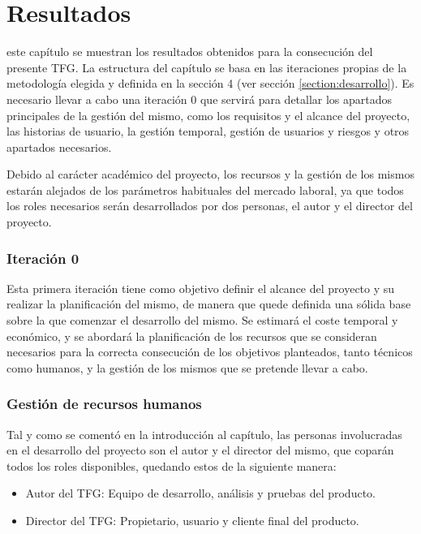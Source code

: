 \chapter{Resultados}
\label{chapter:resultados}



 este capítulo se muestran los resultados obtenidos para la consecución del presente \ac{TFG}. La estructura del capítulo se basa en las iteraciones propias de la metodología elegida y definida en la sección 4 (ver sección \ref{section:desarrollo}). Es necesario llevar a cabo una iteración 0 que servirá para detallar los apartados principales de la gestión del mismo, como los requisitos y el alcance del proyecto, las historias de usuario, la gestión temporal, gestión de usuarios y riesgos y otros apartados necesarios.

Debido al carácter académico del proyecto, los recursos y la gestión de los mismos estarán alejados de los parámetros habituales del mercado laboral, ya que todos los roles necesarios serán desarrollados por dos personas, el autor y el director del proyecto.

\subsection{Iteración 0}
Esta primera iteración tiene como objetivo definir el alcance del proyecto y su realizar la planificación del mismo, de manera que quede definida una sólida base sobre la que comenzar el desarrollo del mismo. Se estimará el coste temporal y económico, y se abordará la planificación de los recursos que se consideran necesarios para la correcta consecución de los objetivos planteados, tanto técnicos como humanos, y la gestión de los mismos que se pretende llevar a cabo.

	\subsection{Gestión de recursos humanos}
	Tal y como se comentó en la introducción al capítulo, las personas involucradas en el desarrollo del proyecto son el autor y el director del mismo, que coparán todos los roles disponibles, quedando estos de la siguiente manera:
	
	\begin{itemize}[label={$\bullet$},labelindent=\parindent,leftmargin=2cm]
		\item Autor del \ac{TFG}: Equipo de desarrollo, análisis y pruebas del producto.
		\item Director del \ac{TFG}: Propietario, usuario y cliente final del producto.
	\end{itemize}
	
